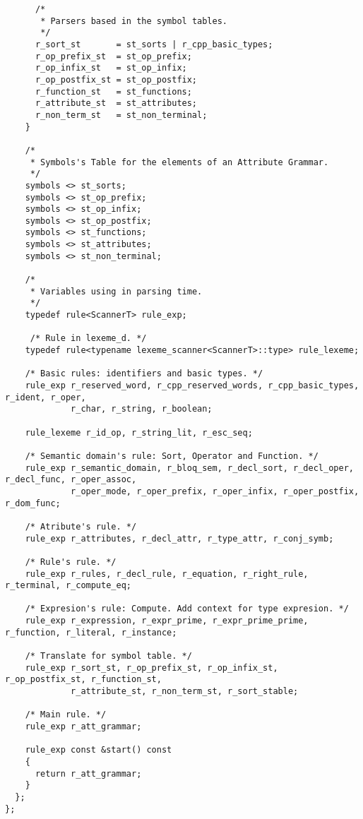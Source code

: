 \begin{center}
\begin{lstlisting}
      /*
       * Parsers based in the symbol tables.
       */
      r_sort_st       = st_sorts | r_cpp_basic_types;
      r_op_prefix_st  = st_op_prefix;
      r_op_infix_st   = st_op_infix;
      r_op_postfix_st = st_op_postfix;
      r_function_st   = st_functions;
      r_attribute_st  = st_attributes;
      r_non_term_st   = st_non_terminal;
    }

    /*
     * Symbols's Table for the elements of an Attribute Grammar.
     */
    symbols <> st_sorts;
    symbols <> st_op_prefix;
    symbols <> st_op_infix;
    symbols <> st_op_postfix;
    symbols <> st_functions;
    symbols <> st_attributes;
    symbols <> st_non_terminal;

    /*
     * Variables using in parsing time.
     */
    typedef rule<ScannerT> rule_exp;

     /* Rule in lexeme_d. */
    typedef rule<typename lexeme_scanner<ScannerT>::type> rule_lexeme;

    /* Basic rules: identifiers and basic types. */
    rule_exp r_reserved_word, r_cpp_reserved_words, r_cpp_basic_types, r_ident, r_oper,
             r_char, r_string, r_boolean;

    rule_lexeme r_id_op, r_string_lit, r_esc_seq;

    /* Semantic domain's rule: Sort, Operator and Function. */
    rule_exp r_semantic_domain, r_bloq_sem, r_decl_sort, r_decl_oper, r_decl_func, r_oper_assoc,
             r_oper_mode, r_oper_prefix, r_oper_infix, r_oper_postfix, r_dom_func;

    /* Atribute's rule. */
    rule_exp r_attributes, r_decl_attr, r_type_attr, r_conj_symb;

    /* Rule's rule. */
    rule_exp r_rules, r_decl_rule, r_equation, r_right_rule, r_terminal, r_compute_eq;

    /* Expresion's rule: Compute. Add context for type expresion. */
    rule_exp r_expression, r_expr_prime, r_expr_prime_prime, r_function, r_literal, r_instance;

    /* Translate for symbol table. */
    rule_exp r_sort_st, r_op_prefix_st, r_op_infix_st, r_op_postfix_st, r_function_st,
             r_attribute_st, r_non_term_st, r_sort_stable;

    /* Main rule. */
    rule_exp r_att_grammar;

    rule_exp const &start() const
    {
      return r_att_grammar;
    }
  };
};
\end{lstlisting}\end{center}
